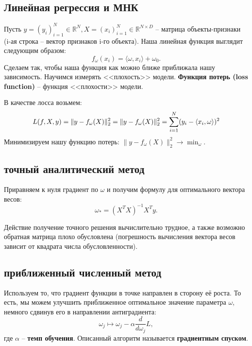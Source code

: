 \documentclass[a4paper, 10pt, openany]{book} %
\begin{document}
	\subsection{Линейная регрессия и МНК}
	
	Пусть $y = (y_i)_{i=1}^N  \in \mathbb{R}^N, X = (x_i)_{i=1}^N \in \mathbb{R}^{N \times D}$ -- матрица объекты-признаки (i-ая строка -- вектор признаков i-го объекта). Наша линейная функция выглядит следующим образом:
	\begin{equation*}
		f_\omega(x_i) = \langle \omega, x_i \rangle + \omega_0.
	\end{equation*}
	Сделаем так, чтобы наша функция как можно ближе приближала нашу зависимость. Научимся измерять <<плохость>> модели. \textbf{Функция потерь (loss function)} -- функция <<плохости>> модели.
	
	В качестве лосса возьмем: 
	\begin{equation*}
		L(f,X,y) = \|y - f_\omega(X)\|_2^2 = \\
		\|y - f_\omega(X)\|_2^2 = \sum_{i=1}^{N}(y_i - \langle x_i, \omega \rangle)^2
	\end{equation*}
	Минимизируем нашу функцию потерь: $\|y - f_\omega(X)\|_2^2 \rightarrow \mathop{min}_{\omega}$.
	
	\subsection{точный аналитический метод}
	
	Приравняем к нуля градиент по $\omega$ и получим формулу для оптимального вектора весов:
	\begin{equation*}
		\omega_* = \left(X^T X\right)^{-1} X^T y.
	\end{equation*}
	
	Действие получение точного решения вычислительно трудное, а также возможно обратная матрица плохо обусловлена (погрешность вычисления вектора весов зависит от квадрата 	числа обусловленности).
	
	\subsection{приближенный численный метод}
	
	Используем то, что градиент функции в точке направлен в сторону её роста. То есть, мы можем улучшить приближенное оптимальное значение параметра $\omega$, немного сдвинув его в направлении антиградиента:
	\begin{equation*}
		\omega_j \mapsto \omega_j - \alpha \frac{d}{d \omega_j} L,
	\end{equation*}
	где $\alpha$ -- \textbf{темп обучения}. Описанный алгоритм называется \textbf{градиентным спуском}.
	
\end{document}
